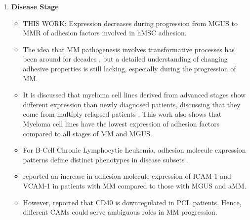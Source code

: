\begin{enumerate}
      \item \textbf{Disease Stage}
            \begin{itemize}
                  \item THIS WORK: Expression decreases during progression from
                        \ac{MGUS} to \ac{MMR} of adhesion factors involved in hMSC
                        adhesion.
                  \item The idea that MM pathogenesis involves transformative
                        processes has been around for decades
                        \cite{hallekMultipleMyelomaIncreasing1998}, but a
                        detailed understanding of changing adhesive properties
                        is still lacking, especially during the progression of
                        MM.
                  \item It is discussed that myeloma cell lines derived from
                        advanced stages show different expression than newly
                        diagnosed patients, discussing that they come from
                        multiply relapsed patients
                        \cite{sarinEvaluatingEfficacyMultiple2020}. This work
                        also shows that Myeloma cell lines have the lowest
                        expression of adhesion factors compared to all stages of
                        \ac{MM} and \ac{MGUS}.
                  \item For B-Cell Chronic Lymphocytic Leukemia, adhesion
                        molecule expression patterns define distinct phenotypes in
                        disease subsets \cite{derossiAdhesionMoleculeExpression1993}.
                  \item \citet{terposIncreasedCirculatingVCAM12016} reported an
                        increase in adhesion molecule expression of ICAM-1 and
                        VCAM-1 in patients with \ac{MM} compared to those with
                        \ac{MGUS} and \ac{aMM}.
                  \item However, \citet{perez-andresClonalPlasmaCells2005}
                        reported that CD40 is downregulated in \ac{PCL}
                        patients. Hence, different \acp{CAM} could serve
                        ambiguous roles in \ac{MM} progression.
            \end{itemize}


\end{enumerate}
